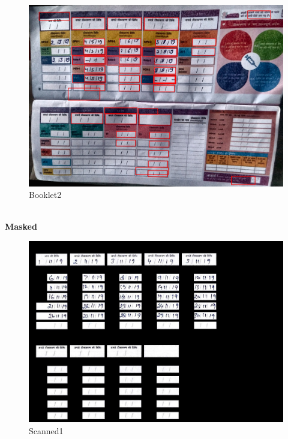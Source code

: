 \documentclass{article}
\begin{document}
    \begin{figure}[!htb]
    \minipage{\textwidth}
    \begin{center}
      \includegraphics[scale=.25]{4/.report/_segmented/_cont/b2.jpg}
      \caption{Booklet2}
    \end{center}
    \endminipage
    \end{figure}
\pagebreak\\
\textbf{Masked}
    \begin{figure}[!htb]
    \minipage{\textwidth}
    \begin{center}
      \includegraphics[scale=.25]{4/.report/_segmented/_mask/s1.jpg}
      \caption{Scanned1}
    \end{center}
    \endminipage
    \end{figure}
\end{document}
